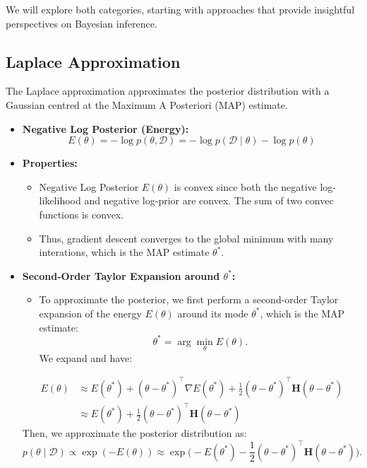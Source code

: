We will explore both categories, starting with approaches that provide insightful perspectives on Bayesian inference.

\subsection{Laplace Approximation}

The Laplace approximation approximates the posterior distribution with a Gaussian centred at the Maximum A Posteriori (MAP) estimate.

\begin{itemize}
    \item \textbf{Negative Log Posterior (Energy):}
          \[
              E(\theta) = -\log p(\theta, \mathcal{D}) = -\log p(\mathcal{D} \mid \theta) - \log p(\theta)
          \]
    \item \textbf{Properties:}
          \begin{itemize}
              \item Negative Log Posterior $E(\theta)$ is convex since both the negative log-likelihood and negative log-prior are convex. The sum of two convec functions is convex.
              \item Thus, gradient descent converges to the global minimum with many interations, which is the MAP estimate $\theta^{*}$.
          \end{itemize}
    \item \textbf{Second-Order Taylor Expansion around $\theta^{*}$:}
          \begin{itemize}
              \item To approximate the posterior, we first perform a second-order Taylor expansion of the energy $E(\theta)$ around its mode $\theta^{*}$, which is the MAP estimate:
                    \[
                        \theta^* = \arg\min_{\theta} E(\theta).
                    \]
                    We expand and have:
          \end{itemize}
          \begin{align*}
              E(\theta) & \approx E(\theta^*) + (\theta - \theta^*)^\top \nabla E(\theta^*) + \frac{1}{2} (\theta - \theta^*)^\top \mathbf{H} (\theta - \theta^*) \\
                        & \approx E(\theta^*) + \frac{1}{2} (\theta - \theta^*)^\top \mathbf{H} (\theta - \theta^*)
          \end{align*}
          Then, we approximate the posterior distribution as:
          $$p(\theta\mid\mathcal{D})\propto\exp(-E(\theta))\approx\exp\biggl(-E(\theta^{*})-\frac{1}{2}(\theta-\theta^{*})^{\top}\mathbf{H}(\theta-\theta^{*})\biggr).$$

\end{itemize}
